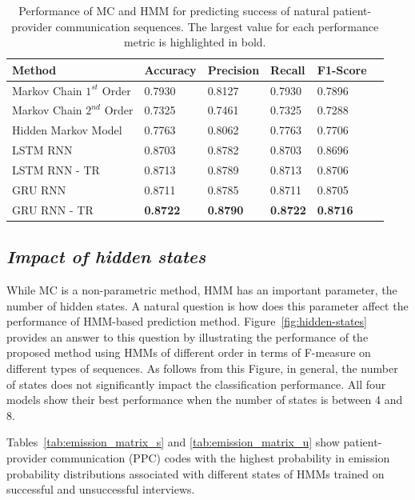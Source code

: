 \documentclass{amia_summit_2018}
\begin{document}
\begin{table}[h]
\centering
\caption{Performance of MC and HMM for predicting success of natural patient-provider communication sequences. The largest value for each performance metric is highlighted in bold.}
\label{tab:result_over_sampled}
  \begin{tabular}{|l|l|l|l|l|l|}
  \hline
   \textbf{Method} & \textbf{Accuracy}  & \textbf{Precision}  & \textbf{Recall} & \textbf{F1-Score}\\ \hline    
    
 Markov Chain $1^{st}$ Order & 0.7930 & 0.8127 & 0.7930 & 0.7896\\ \hline
 Markov Chain $2^{nd}$ Order & 0.7325 & 0.7461 & 0.7325 & 0.7288\\ \hline
 Hidden Markov Model & 0.7763 & 0.8062 & 0.7763 & 0.7706\\ \hline
 LSTM RNN & 0.8703 & 0.8782 & 0.8703 & 0.8696\\ \hline
 LSTM RNN - TR & 0.8713 & 0.8789 & 0.8713 & 0.8706\\ \hline
 GRU RNN & 0.8711 & 0.8785 & 0.8711 & 0.8705\\ \hline
 GRU RNN - TR & \textbf{0.8722} & \textbf{0.8790} & \textbf{0.8722} & \textbf{0.8716}\\ \hline
  \end{tabular}
\end{table}

\subsection*{\textit{Impact of hidden states}}
While MC is a non-parametric method, HMM has an important parameter, the number of hidden states. A natural question is how does this parameter affect the performance of HMM-based prediction  method. Figure~\ref{fig:hidden-states} provides an answer to this question by illustrating the performance of the proposed method using HMMs of different order in terms of F-measure on different types of sequences. As follows from this Figure, in general, the number of states does not significantly impact the classification performance. All four models show their best performance when the number of states is between 4 and 8. 

Tables~\ref{tab:emission_matrix_s} and \ref{tab:emission_matrix_u} show patient-provider communication (PPC) codes with the highest probability in emission probability distributions associated with different states of HMMs trained on successful and unsuccessful interviews.\\
\end{document}
